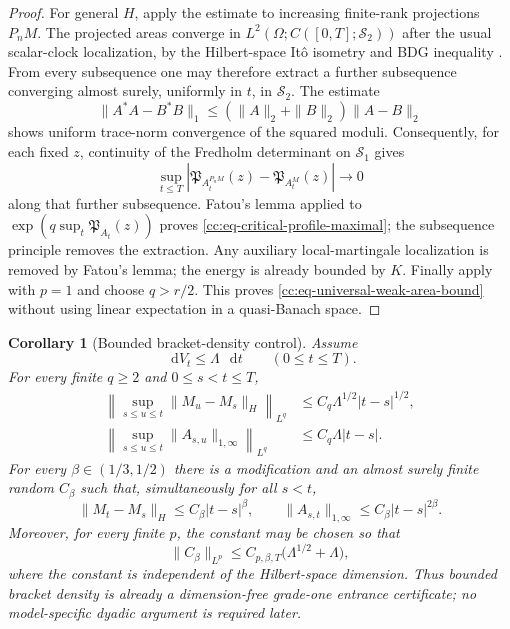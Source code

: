 \documentclass[10pt,reqno]{amsart}
\theoremstyle{plain}
\newtheorem{corollary}[theorem]{Corollary}
\theoremstyle{definition}
\theoremstyle{remark}
\begin{document}
\begin{proof}
For general \(H\), apply the estimate to increasing finite-rank
projections \(P_nM\).  The projected areas converge in
\(L^2(\Omega;C([0,T];\mathcal S_2))\) after the usual scalar-clock
localization, by the Hilbert-space It\^o isometry and BDG inequality
\cite{MetivierPellaumail80}.  From every subsequence one may therefore
extract a further subsequence converging almost surely, uniformly in
\(t\), in \(\mathcal S_2\).  The estimate
\[
 \|A^*A-B^*B\|_1
 \leq(\|A\|_2+\|B\|_2)\|A-B\|_2
\]
shows uniform trace-norm convergence of the squared moduli.
Consequently, for each fixed \(z\), continuity of the Fredholm
determinant on \(\mathcal S_1\) gives
\[
 \sup_{t\leq T}
 |\mathfrak P_{A_t^{P_nM}}(z)-\mathfrak P_{A_t^M}(z)|
 \longrightarrow0
\]
along that further subsequence.  Fatou's lemma applied to
\(\exp(q\sup_t\mathfrak P_{A_t}(z))\) proves
\eqref{cc:eq-critical-profile-maximal}; the subsequence principle removes
the extraction.  Any auxiliary local-martingale localization is removed by
Fatou's lemma; the energy is already bounded by \(K\).  Finally apply
 with \(p=1\) and choose \(q>r/2\).
This proves \eqref{cc:eq-universal-weak-area-bound} without using linear
expectation in a quasi-Banach space.
\end{proof}

\begin{corollary}[Bounded bracket-density control]
\label{cc:cor-critical-bracket-density-control}
Assume
\begin{equation}
 \mathop{}\!\mathrm dV_t\leq\Lambda\,\mathop{}\!\mathrm dt
 \qquad(0\leq t\leq T).
 \label{cc:eq-critical-bracket-density}
\end{equation}
For every finite \(q\geq2\) and \(0\leq s<t\leq T\),
\begin{align}
 \left\|\sup_{s\leq u\leq t}\|M_u-M_s\|_H\right\|_{L^q}
 &\leq C_q\Lambda^{1/2}|t-s|^{1/2},
 \label{cc:eq-critical-local-first}\\
 \left\|\sup_{s\leq u\leq t}\|A_{s,u}\|_{1,\infty}\right\|_{L^q}
 &\leq C_q\Lambda|t-s|.
 \label{cc:eq-critical-local-area}
\end{align}
For every \(\beta\in(1/3,1/2)\) there is a modification and an almost
surely finite random \(C_\beta\) such that, simultaneously for all
\(s<t\),
\begin{equation}
 \|M_t-M_s\|_H\leq C_\beta|t-s|^\beta,
 \qquad
 \|A_{s,t}\|_{1,\infty}\leq C_\beta|t-s|^{2\beta}.
 \label{cc:eq-critical-local-holder}
\end{equation}
Moreover, for every finite \(p\), the constant may be chosen so that
\begin{equation}
 \|C_\beta\|_{L^p}
 \leq C_{p,\beta,T}\bigl(\Lambda^{1/2}+\Lambda\bigr),
 \label{cc:eq-critical-holder-moments}
\end{equation}
where the constant is independent of the Hilbert-space dimension.  Thus
bounded bracket density is already a dimension-free grade-one entrance
certificate; no model-specific dyadic argument is required later.
\end{corollary}
\end{document}
